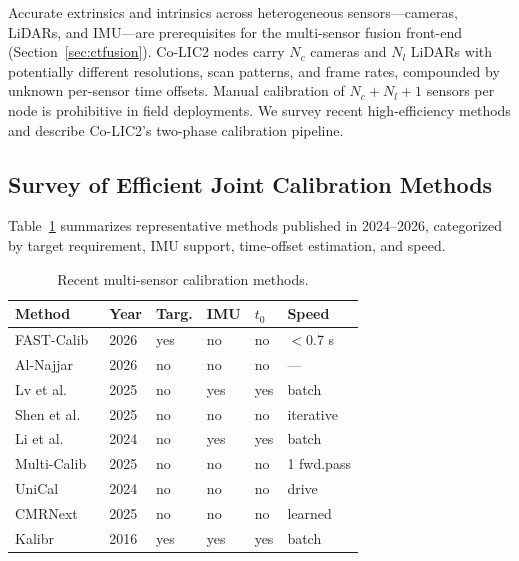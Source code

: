 \label{sec:calibration}

Accurate extrinsics and intrinsics across heterogeneous sensors---cameras,
LiDARs, and IMU---are prerequisites for the multi-sensor fusion front-end
(Section~\ref{sec:ctfusion}). Co-LIC2 nodes carry $N_c$ cameras and $N_l$
LiDARs with potentially different resolutions, scan patterns, and frame
rates, compounded by unknown per-sensor time offsets. Manual calibration of
$N_c+N_l+1$ sensors per node is prohibitive in field deployments. We
survey recent high-efficiency methods and describe Co-LIC2's two-phase
calibration pipeline.

\subsection{Survey of Efficient Joint Calibration Methods}

Table~\ref{tab:calib_survey} summarizes representative methods published
in 2024--2026, categorized by target requirement, IMU support, time-offset
estimation, and speed.

\begin{table}[t]
  \centering
  \caption{Recent multi-sensor calibration methods.}
  \label{tab:calib_survey}
  \footnotesize
  \setlength{\tabcolsep}{2pt}
  \begin{tabular}{@{}p{2.0cm}p{0.9cm}p{0.8cm}p{0.8cm}p{0.8cm}p{2.0cm}@{}}
    \toprule
    Method & Year & Targ.\@ & IMU & $t_0$ & Speed \\
    \midrule
    FAST-Calib~\cite{zheng2026fastcalib}& 2026 & yes& no & no & $<$0.7 s \\
    Al-Najjar~\cite{alnajjar2026joint}  & 2026 & no & no & no & --- \\
    Lv et al.~\cite{lv2025targetless}   & 2025 & no & yes& yes& batch \\
    Shen et al.~\cite{shen2025direct}   & 2025 & no & no & no & iterative \\
    Li et al.~\cite{li2024twostep}      & 2024 & no & yes& yes& batch \\
    Multi-Calib~\cite{hu2025multicalib} & 2025 & no & no & no & 1 fwd.\@ pass \\
    UniCal~\cite{yang2024unical}        & 2024 & no & no & no & drive \\
    CMRNext~\cite{cattaneo2025cmrnext}  & 2025 & no & no & no & learned \\
    Kalibr~\cite{rehder2016kalibr}      & 2016 & yes& yes& yes& batch \\
    \bottomrule
  \end{tabular}
\end{table}

